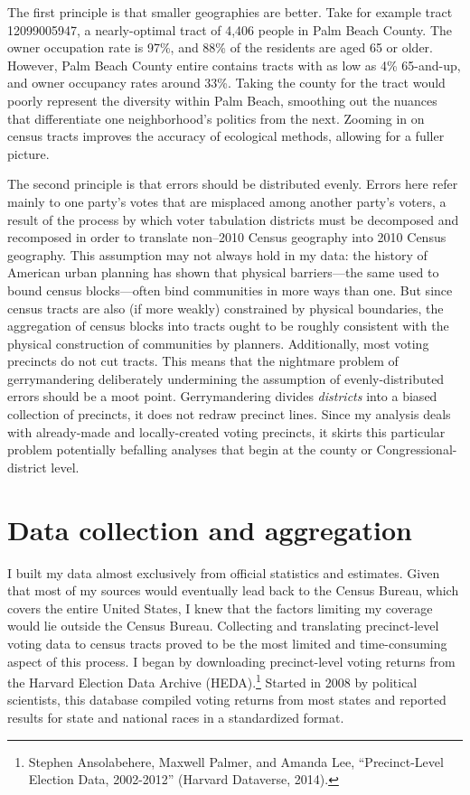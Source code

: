 \documentclass[12pt,oneside]{psthesis}
\begin{document}
The first principle is that smaller geographies are better.
Take for example tract 12099005947, a nearly-optimal tract of 4,406 people in Palm Beach County.
The owner occupation rate is 97\%, and 88\% of the residents are aged 65 or older.
However, Palm Beach County entire contains tracts with as low as 4\% 65-and-up, and owner occupancy rates around 33\%.
Taking the county for the tract would poorly represent the diversity within Palm Beach, smoothing out the nuances that differentiate one neighborhood's politics from the next.
Zooming in on census tracts improves the accuracy of ecological methods, allowing for a fuller picture.

The second principle is that errors should be distributed evenly.
Errors here refer mainly to one party's votes that are misplaced among another party's voters, a result of the process by which voter tabulation districts must be decomposed and recomposed in order to translate non--2010 Census geography into 2010 Census geography.
This assumption may not always hold in my data: the history of American urban planning has shown that physical barriers---the same used to bound census blocks---often bind communities in more ways than one.
But since census tracts are also (if more weakly) constrained by physical boundaries, the aggregation of census blocks into tracts ought to be roughly consistent with the physical construction of communities by planners.
Additionally, most voting precincts do not cut tracts.
This means that the nightmare problem of gerrymandering deliberately undermining the assumption of evenly-distributed errors should be a moot point.
Gerrymandering divides \emph{districts} into a biased collection of precincts, it does not redraw precinct lines.
Since my analysis deals with already-made and locally-created voting precincts, it skirts this particular problem potentially befalling analyses that begin at the county or Congressional-district level.

\hypertarget{data-collection-and-aggregation}{%
\section{Data collection and aggregation}\label{data-collection-and-aggregation}}

I built my data almost exclusively from official statistics and estimates.
Given that most of my sources would eventually lead back to the Census Bureau, which covers the entire United States, I knew that the factors limiting my coverage would lie outside the Census Bureau.
Collecting and translating precinct-level voting data to census tracts proved to be the most limited and time-consuming aspect of this process.
I began by downloading precinct-level voting returns from the Harvard Election Data Archive (HEDA).\footnote{Stephen Ansolabehere, Maxwell Palmer, and Amanda Lee, ``Precinct-Level Election Data, 2002-2012'' (Harvard Dataverse, 2014).}
Started in 2008 by political scientists, this database compiled voting returns from most states and reported results for state and national races in a standardized format.
\end{document}
